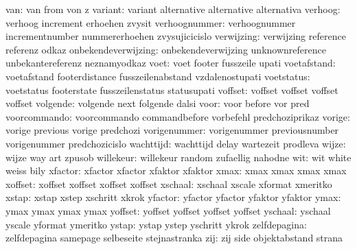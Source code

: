                  van:  van                  from                 von
                       z
             variant:  variant              alternative          alternative
                       alternativa
             verhoog:  verhoog              increment            erhoehen
                       zvysit
       verhoognummer:  verhoognummer        incrementnumber      nummererhoehen
                       zvysujicicislo
          verwijzing:  verwijzing           reference            referenz
                       odkaz
 onbekendeverwijzing:  onbekendeverwijzing  unknownreference     unbekantereferenz
                       neznamyodkaz
                voet:  voet                 footer               fusszeile
                       upati
         voetafstand:  voetafstand          footerdistance       fusszeilenabstand
                       vzdalenostupati
          voetstatus:  voetstatus           footerstate          fusszeilenstatus
                       statusupati
             voffset:  voffset              voffset              voffset
                       voffset
            volgende:  volgende             next                 folgende
                       dalsi
                voor:  voor                 before               vor
                       pred
        voorcommando:  voorcommando         commandbefore        vorbefehl
                       predchoziprikaz
              vorige:  vorige               previous             vorige
                       predchozi
        vorigenummer:  vorigenummer         previousnumber       vorigenummer
                       predchozicislo
           wachttijd:  wachttijd            delay                wartezeit
                       prodleva
               wijze:  wijze                way                  art
                       zpusob
           willekeur:  willekeur            random               zufaellig
                       nahodne
                 wit:  wit                  white                weiss
                       bily
             xfactor:  xfactor              xfactor              xfaktor
                       xfaktor
                xmax:  xmax                 xmax                 xmax
                       xmax
             xoffset:  xoffset              xoffset              xoffset
                       xoffset
             xschaal:  xschaal              xscale               xformat
                       xmeritko
               xstap:  xstap                xstep                xschritt
                       xkrok
             yfactor:  yfactor              yfactor              yfaktor
                       yfaktor
                ymax:  ymax                 ymax                 ymax
                       ymax
             yoffset:  yoffset              yoffset              yoffset
                       yoffset
             yschaal:  yschaal              yscale               yformat
                       ymeritko
               ystap:  ystap                ystep                yschritt
                       ykrok
        zelfdepagina:  zelfdepagina         samepage             selbeseite
                       stejnastranka
                 zij:  zij                  side                 objektabstand
                       strana 

